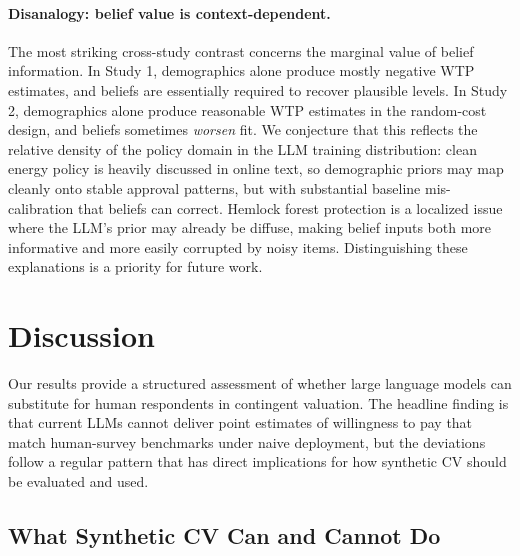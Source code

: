 \documentclass[12pt]{article}
\begin{document}
\paragraph{Disanalogy: belief value is context-dependent.} The most
striking cross-study contrast concerns the marginal value of belief
information. In Study 1, demographics alone produce mostly negative WTP
estimates, and beliefs are essentially required to recover plausible
levels. In Study 2, demographics alone produce reasonable WTP estimates
in the random-cost design, and beliefs sometimes \emph{worsen} fit. We
conjecture that this reflects the relative density of the policy domain
in the LLM training distribution: clean energy policy is heavily discussed
in online text, so demographic priors may map cleanly onto stable approval
patterns, but with substantial baseline mis-calibration that beliefs can
correct. Hemlock forest protection is a localized issue where the LLM's
prior may already be diffuse, making belief inputs both more informative
and more easily corrupted by noisy items. Distinguishing these
explanations is a priority for future work.



%

\section{Discussion}\label{sec:discussion}

Our results provide a structured assessment of whether large language
models can substitute for human respondents in contingent valuation. The
headline finding is that current LLMs cannot deliver point estimates of
willingness to pay that match human-survey benchmarks under naive
deployment, but the deviations follow a regular pattern that has direct
implications for how synthetic CV should be evaluated and used.

\subsection{What Synthetic CV Can and Cannot Do}\label{sec:disc-can-cant}
\end{document}
